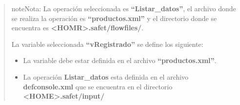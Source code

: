 \documentclass[letterpaper,11pt,spanish]{sphinxmanual}
\begin{document}
\begin{quote}
\begin{notice}{note}{Nota:}
La operación seleccionada es \textbf{``Listar\_datos''}, el archivo donde se realiza la operación es \textbf{``productos.xml''} y el directorio donde se encuentra es \textbf{\textless{}HOMR\textgreater{}.safet/flowfiles/}.
\end{notice}

La variable seleccionada \textbf{``vRegistrado''} se define los siguiente:
\begin{itemize}
\item {} 
La variable debe estar definida en el archivo \textbf{``productos.xml''}.

\item {} 
La operación \textbf{Listar\_datos} esta definida en el archivo \textbf{defconsole.xml} que se encuentra en el directorio \textbf{\textless{}HOME\textgreater{}.safet/input/}

\end{itemize}
\end{quote}
\end{document}
